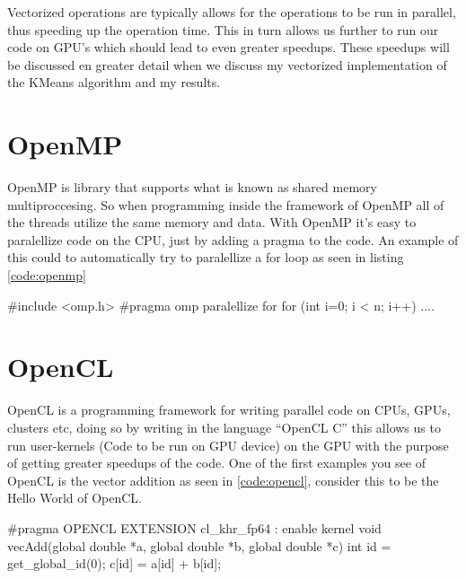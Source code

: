 \documentclass[12pt]{report}
\begin{document}
Vectorized operations are typically allows for the operations to be run in parallel, thus speeding up the operation time. This in turn allows us further to run our code on GPU's which should lead to even greater speedups. These speedups will be discussed en greater detail when we discuss my vectorized implementation of the KMeans algorithm and my results.

\section{OpenMP}
\label{subsec:openmp}
OpenMP is  library that supports what is known as shared memory multiproccesing. So when programming inside the framework of OpenMP all of the threads utilize the same memory and data. With OpenMP it's easy to paralellize code on the CPU, just by adding a pragma to the code. An example of this could to automatically try to paralellize a for loop as seen in listing \ref{code:openmp}


\begin{c_lang}[caption={Example of how to automatically paralellize for loops with OpenMP}\label{code:openmp}]
  #include <omp.h>
  #pragma omp paralellize for
  for (int i=0; i < n; i++) {
    ....
  }
\end{c_lang}

\section{OpenCL}
\label{subsec:opencl}
OpenCL is a programming framework for writing parallel code on CPUs, GPUs, clusters etc, doing so by writing in the language ``OpenCL C'' this allows us to run user-kernels (Code to be run on GPU device) on the GPU with the purpose of getting greater speedups of the code. One of the first examples you see of OpenCL is the vector addition as seen in \ref{code:opencl}, consider this to be the Hello World of OpenCL.

\begin{c_lang}[caption={Example of adding to vectors in OpenCL}\label{code:opencl}]
  #pragma OPENCL EXTENSION cl_khr_fp64 : enable
  kernel void vecAdd(global double *a, global double *b,
                                       global double *c){
    int id = get_global_id(0);
    c[id] = a[id] + b[id];
  }
\end{c_lang}
\end{document}
